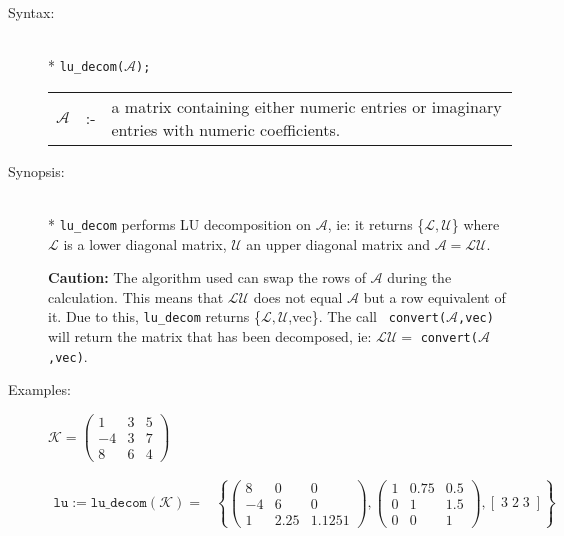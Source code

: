 \begin{description}
\item[Syntax:]\mbox{}\\*
\texttt{lu\_decom($\mathcal{A}$);}\\[2mm]
\begin{tabular}{l l l}
$\mathcal{A}$ &:-& \parbox[t]{.848\linewidth}{a matrix containing either 
numeric entries or imaginary entries with numeric coefficients.}
\end{tabular}

\item[Synopsis:]\mbox{}\\*
  \texttt{lu\_decom} performs LU decomposition on $\mathcal{A}$, ie: it returns
  \{$\mathcal{L,U}$\} where $\mathcal{L}$ is a lower diagonal matrix, $\mathcal{U}$ an
  upper diagonal matrix and $\mathcal{A} = \mathcal{LU}$.

\textbf{Caution:}
  The algorithm used can swap the rows of $\mathcal{A}$ during the calculation. This
  means that $\mathcal{LU}$ does not equal $\mathcal{A}$ but a row equivalent of it. Due
  to this, \texttt{lu\_decom} returns \{$\mathcal{L,U}$,vec\}. The call {\tt
  convert($\mathcal{A}$,vec)} will return the matrix that has been decomposed, ie:
  $\mathcal{LU} = $ \texttt{convert($\mathcal{A}$,vec)}.

\item[Examples:]
\begin{flushleft}
\begin{math}  
\mathcal{K} = \begin{pmatrix} 1 & 3 & 5 \\ -4 & 3 & 7 \\ 8 & 6 & 4 \end{pmatrix}
\end{math}  
\end{flushleft}

\begin{align*}  
\texttt{lu} := \texttt{lu\_decom}(\mathcal{K}) = &
\left\{ 
        \begin{pmatrix} 8 & 0 & 0 \\ -4 & 6 & 0 \\ 1 & 2.25 & 1.125 1 \end{pmatrix}, 
        \begin{pmatrix} 1 & 0.75 & 0.5 \\ 0 & 1 & 1.5 \\ 0 & 0 & 1 \end{pmatrix}, 
	[\; 3 \; 2 \; 3 \; ]
\right\} 
\end{align*}  


\end{description}
